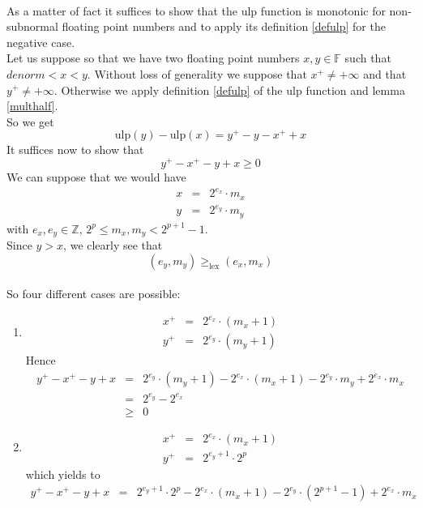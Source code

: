 \documentclass[a4paper,10pt,twoside]{article}
\newenvironment{proof}[1][Proof]{\begin{trivlist}
\item[\hskip \labelsep {\bfseries #1}]}{\end{trivlist}}
\newcommand{\Z}{\ensuremath{\mathbb {Z}}}
\newcommand{\F}{\ensuremath{\mathbb {F}}}
\newcommand{\mUlp}{\ensuremath{\mathrm{ulp}}}
\begin{document}
\begin{proof} ~ \\
As a matter of fact it suffices to show that the $\mUlp$ function is monotonic for non-subnormal floating point numbers
and to apply its definition \ref{defulp} for the negative case.\\
Let us suppose so that we have two floating point numbers $x, y \in \F$ such that $denorm < x < y$.
Without loss of generality we suppose that $x^+ \not = + \infty$ and that
$y^+ \not = + \infty$. Otherwise we apply definition \ref{defulp} of the $\mUlp$ function and lemma \ref{multhalf}.\\
So we get
$$\mUlp\left( y \right) - \mUlp\left( x \right) = y^+ - y - x^+ + x$$
It suffices now to show that
$$y^+ - x^+ - y + x \geq 0$$
We can suppose that we would have
\begin{eqnarray*}
x & = & 2^{e_x} \cdot m_x \\
y & = & 2^{e_y} \cdot m_y
\end{eqnarray*}
with $e_x, e_y \in \Z$, $2^p \leq m_x, m_y < 2^{p+1} - 1$.\\
Since $y > x$, we clearly see that
$$\left( e_y, m_y \right) \geq_{\mbox{lex}} \left( e_x, m_x \right)$$ \\
So four different cases are possible:
\begin{enumerate}
\item \begin{eqnarray*}
x^+ & = & 2^{e_x} \cdot \left( m_x + 1 \right) \\
y^+ & = & 2^{e_y} \cdot \left( m_y + 1 \right)
\end{eqnarray*}
Hence
\begin{eqnarray*}
y^+ - x^+ - y + x & = & 2^{e_y} \cdot \left( m_y + 1 \right) - 2^{e_x} \cdot \left( m_x + 1 \right) - 2^{e_y} \cdot m_y + 2^{e_x} \cdot m_x \\
& = & 2^{e_y} - 2^{e_x} \\
& \geq & 0
\end{eqnarray*}
\item \begin{eqnarray*}
x^+ & = & 2^{e_x} \cdot \left( m_x + 1 \right) \\
y^+ & = & 2^{e_y+1} \cdot 2^p
\end{eqnarray*}
which yields to
\begin{eqnarray*}
y^+ - x^+ - y + x & = & 2^{e_y+1} \cdot 2^p - 2^{e_x} \cdot \left( m_x + 1 \right) - 2^{e_y} \cdot \left( 2^{p+1} - 1 \right) + 2^{e_x} \cdot m_x \\

\end{eqnarray*}
\end{enumerate}
\end{proof}
\end{document}
